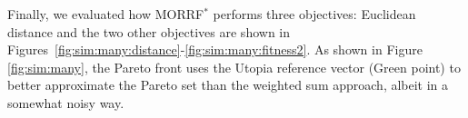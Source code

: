\documentclass{article}
\begin{document}

Finally, we evaluated how MORRF$^{*}$ performs three objectives: 
Euclidean distance and the two other objectives are shown in Figures~\ref{fig:sim:many:distance}-\ref{fig:sim:many:fitness2}.
As shown in Figure \ref{fig:sim:many}, the Pareto front uses the Utopia reference vector (Green point) to better approximate the Pareto set than the weighted sum approach, albeit in a somewhat noisy way.
\end{document}

